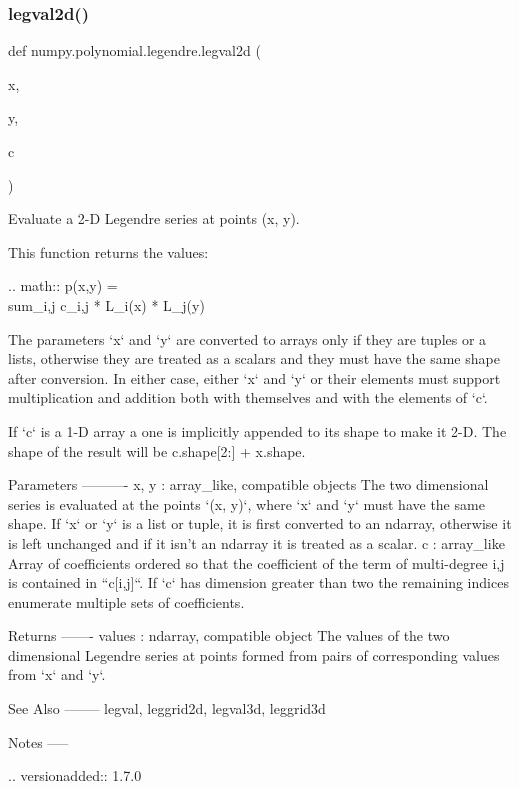 \subsubsection{\texorpdfstring{legval2d()}{legval2d()}}
{\footnotesize\ttfamily def numpy.\+polynomial.\+legendre.\+legval2d (\begin{DoxyParamCaption}\item[{}]{x,  }\item[{}]{y,  }\item[{}]{c }\end{DoxyParamCaption})}

\begin{DoxyVerb}Evaluate a 2-D Legendre series at points (x, y).

This function returns the values:

.. math:: p(x,y) = \\sum_{i,j} c_{i,j} * L_i(x) * L_j(y)

The parameters `x` and `y` are converted to arrays only if they are
tuples or a lists, otherwise they are treated as a scalars and they
must have the same shape after conversion. In either case, either `x`
and `y` or their elements must support multiplication and addition both
with themselves and with the elements of `c`.

If `c` is a 1-D array a one is implicitly appended to its shape to make
it 2-D. The shape of the result will be c.shape[2:] + x.shape.

Parameters
----------
x, y : array_like, compatible objects
    The two dimensional series is evaluated at the points `(x, y)`,
    where `x` and `y` must have the same shape. If `x` or `y` is a list
    or tuple, it is first converted to an ndarray, otherwise it is left
    unchanged and if it isn't an ndarray it is treated as a scalar.
c : array_like
    Array of coefficients ordered so that the coefficient of the term
    of multi-degree i,j is contained in ``c[i,j]``. If `c` has
    dimension greater than two the remaining indices enumerate multiple
    sets of coefficients.

Returns
-------
values : ndarray, compatible object
    The values of the two dimensional Legendre series at points formed
    from pairs of corresponding values from `x` and `y`.

See Also
--------
legval, leggrid2d, legval3d, leggrid3d

Notes
-----

.. versionadded:: 1.7.0\end{DoxyVerb}
 \mbox{\label{namespacenumpy_1_1polynomial_1_1legendre_a3c1afe9a5233c8baf96b034392f7f339}} 
